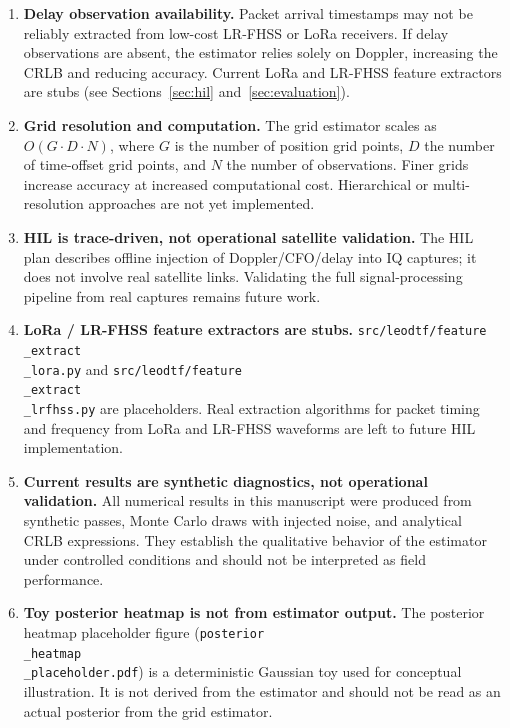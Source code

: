 \begin{enumerate}
  \item \textbf{Delay observation availability.}  Packet arrival timestamps
        may not be reliably extracted from low-cost LR-FHSS or LoRa receivers.
        If delay observations are absent, the estimator relies solely on
        Doppler, increasing the CRLB and reducing accuracy.  Current LoRa and
        LR-FHSS feature extractors are stubs (see
        Sections~\ref{sec:hil} and~\ref{sec:evaluation}).

  \item \textbf{Grid resolution and computation.}  The grid estimator scales as
        $O(G \cdot D \cdot N)$, where $G$ is the number of position grid
        points, $D$ the number of time-offset grid points, and $N$ the number
        of observations.  Finer grids increase accuracy at increased
        computational cost.  Hierarchical or multi-resolution approaches are
        not yet implemented.

  \item \textbf{HIL is trace-driven, not operational satellite validation.}
        The HIL plan describes offline injection of Doppler/CFO/delay into IQ
        captures; it does not involve real satellite links.  Validating the
        full signal-processing pipeline from real captures remains future work.

\item \textbf{LoRa / LR-FHSS feature extractors are stubs.}
        \texttt{src/leodtf/feature\\_extract\\_lora.py} and
        \texttt{src/leodtf/feature\\_extract\\_lrfhss.py} are placeholders.  Real
        extraction algorithms for packet timing and frequency from LoRa and
        LR-FHSS waveforms are left to future HIL implementation.

  \item \textbf{Current results are synthetic diagnostics, not operational
        validation.}  All numerical results in this manuscript were produced
        from synthetic passes, Monte Carlo draws with injected noise, and
        analytical CRLB expressions.  They establish the qualitative behavior
        of the estimator under controlled conditions and should not be
        interpreted as field performance.

  \item \textbf{Toy posterior heatmap is not from estimator output.}
        The posterior heatmap placeholder figure
        (\texttt{posterior\\_heatmap\\_placeholder.pdf}) is a deterministic
        Gaussian toy used for conceptual illustration.  It is not derived
        from the estimator and should not be read as an actual posterior
        from the grid estimator.


\end{enumerate}

